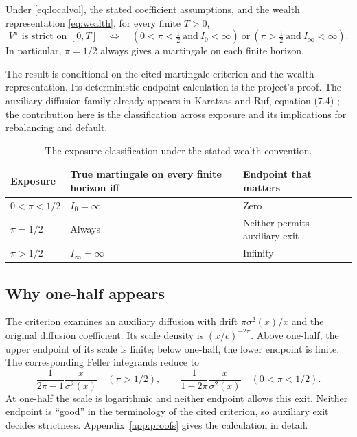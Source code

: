 \begin{theorem}\label{thm:exposure}
Under \eqref{eq:localvol}, the stated coefficient assumptions, and the wealth
representation \eqref{eq:wealth}, for every finite $T>0$,
\begin{equation}\label{eq:classification}
 V^\pi\text{ is strict on }[0,T]\quad\Longleftrightarrow\quad
 \left(0<\pi<\tfrac12\ \text{and}\ I_0<\infty\right)
 \ \text{or}\ 
 \left(\pi>\tfrac12\ \text{and}\ I_\infty<\infty\right).
\end{equation}
In particular, $\pi=1/2$ always gives a martingale on each finite horizon.
\end{theorem}

\noindent The result is conditional on the cited martingale criterion and
the wealth representation. Its deterministic endpoint calculation is the
project's proof. The auxiliary-diffusion family already appears in
Karatzas and Ruf, equation (7.4) \cite{karatzas2015distribution}; the
contribution here is the classification across exposure and its implications
for rebalancing and default.

\begin{table}[htbp]\centering
\begin{tabular}{@{}lll@{}}\toprule
Exposure & True martingale on every finite horizon iff & Endpoint that matters\\
\midrule
$0<\pi<1/2$ & $I_0=\infty$ & Zero\\
$\pi=1/2$ & Always & Neither permits auxiliary exit\\
$\pi>1/2$ & $I_\infty=\infty$ & Infinity\\
\bottomrule\end{tabular}
\caption{The exposure classification under the stated wealth convention.}
\end{table}

\subsection{Why one-half appears}
The criterion examines an auxiliary diffusion with drift
$\pi\sigma^2(x)/x$ and the original diffusion coefficient. Its scale density is
$(x/c)^{-2\pi}$. Above one-half, the upper endpoint of its scale is finite;
below one-half, the lower endpoint is finite. The corresponding Feller
integrands reduce to
\begin{equation}\label{eq:fellerkernels}
 \frac{1}{2\pi-1}\frac{x}{\sigma^2(x)}\quad(\pi>1/2),
 \qquad
 \frac{1}{1-2\pi}\frac{x}{\sigma^2(x)}\quad(0<\pi<1/2).
\end{equation}
At one-half the scale is logarithmic and neither endpoint allows this exit.
Neither endpoint is ``good'' in the terminology of the cited criterion, so
auxiliary exit decides strictness. Appendix~\ref{app:proofs} gives the
calculation in detail.


